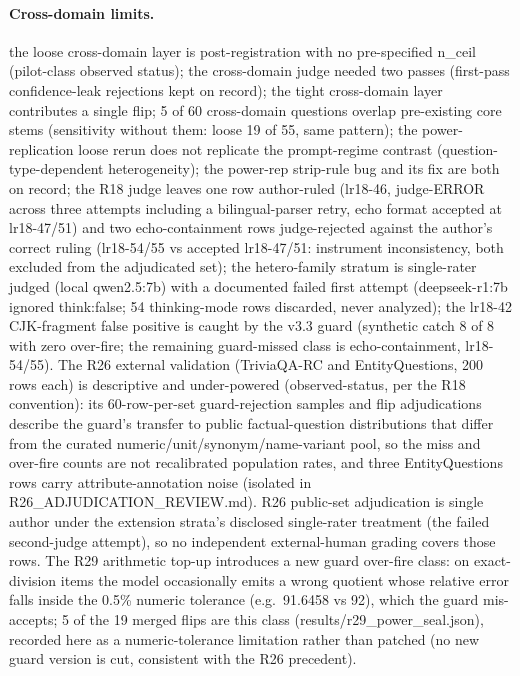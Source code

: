 \documentclass[10pt]{article} %
\begin{document}
\paragraph*{Cross-domain limits.} the loose cross-domain layer is post-registration with no pre-specified n\_ceil (pilot-class observed status); the cross-domain judge needed two passes (first-pass confidence-leak rejections kept on record); the tight cross-domain layer contributes a single flip; 5 of 60 cross-domain questions overlap pre-existing core stems (sensitivity without them: loose 19 of 55, same pattern); the power-replication loose rerun does not replicate the prompt-regime contrast (question-type-dependent heterogeneity); the power-rep strip-rule bug and its fix are both on record; the R18 judge leaves one row author-ruled (lr18-46, judge-ERROR across three attempts including a bilingual-parser retry, echo format accepted at lr18-47/51) and two echo-containment rows judge-rejected against the author's correct ruling (lr18-54/55 vs accepted lr18-47/51: instrument inconsistency, both excluded from the adjudicated set); the hetero-family stratum is single-rater judged (local qwen2.5:7b) with a documented failed first attempt (deepseek-r1:7b ignored think:false; 54 thinking-mode rows discarded, never analyzed); the lr18-42 CJK-fragment false positive is caught by the v3.3 guard (synthetic catch 8 of 8 with zero over-fire; the remaining guard-missed class is echo-containment, lr18-54/55). The R26 external validation (TriviaQA-RC and EntityQuestions, 200 rows each) is descriptive and under-powered (observed-status, per the R18 convention): its 60-row-per-set guard-rejection samples and flip adjudications describe the guard's transfer to public factual-question distributions that differ from the curated numeric/unit/synonym/name-variant pool, so the miss and over-fire counts are not recalibrated population rates, and three EntityQuestions rows carry attribute-annotation noise (isolated in R26\_ADJUDICATION\_REVIEW.md). R26 public-set adjudication is single author under the extension strata's disclosed single-rater treatment (the failed second-judge attempt), so no independent external-human grading covers those rows. The R29 arithmetic top-up introduces a new guard over-fire class: on exact-division items the model occasionally emits a wrong quotient whose relative error falls inside the 0.5\% numeric tolerance (e.g.\ 91.6458 vs 92), which the guard mis-accepts; 5 of the 19 merged flips are this class (results/r29\_power\_seal.json), recorded here as a numeric-tolerance limitation rather than patched (no new guard version is cut, consistent with the R26 precedent).
\end{document}

